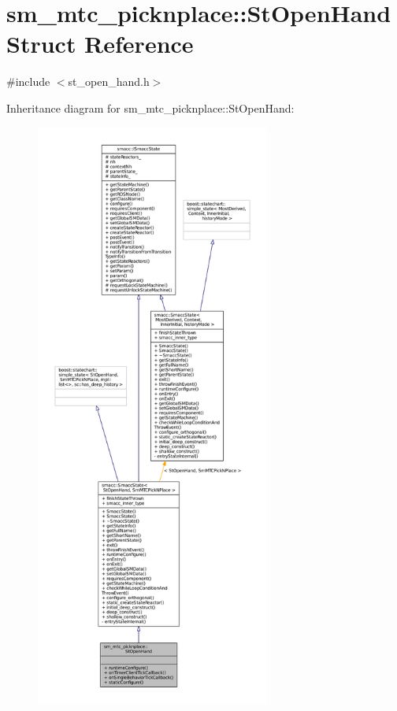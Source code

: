 \hypertarget{structsm__mtc__picknplace_1_1StOpenHand}{}\section{sm\+\_\+mtc\+\_\+picknplace\+:\+:St\+Open\+Hand Struct Reference}
\label{structsm__mtc__picknplace_1_1StOpenHand}


{\ttfamily \#include $<$st\+\_\+open\+\_\+hand.\+h$>$}



Inheritance diagram for sm\+\_\+mtc\+\_\+picknplace\+:\+:St\+Open\+Hand\+:
\nopagebreak
\begin{figure}[H]
\begin{center}
\leavevmode
\includegraphics[height=550pt]{structsm__mtc__picknplace_1_1StOpenHand__inherit__graph}
\end{center}
\end{figure}


